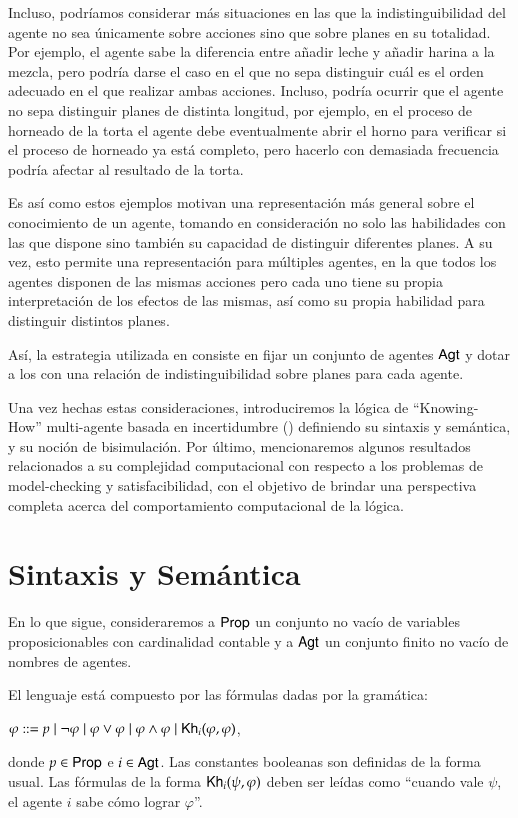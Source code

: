 Incluso, podríamos considerar más situaciones en las que la indistinguibilidad del agente no sea únicamente sobre acciones sino que sobre planes en su totalidad. Por ejemplo, 
el agente sabe la diferencia entre añadir leche y añadir harina a la mezcla, pero podría darse el caso en el que no sepa distinguir cuál es el orden adecuado en el que 
realizar ambas acciones. Incluso, podría ocurrir que el agente no sepa distinguir planes de distinta longitud, por ejemplo, en el proceso de horneado de la torta el agente 
debe eventualmente abrir el horno para verificar si el proceso de horneado ya está completo, pero hacerlo con demasiada frecuencia podría afectar al resultado de la torta.

Es así como estos ejemplos motivan una representación más general sobre el conocimiento de un agente, tomando en consideración no solo las habilidades con las que dispone sino 
también su capacidad de distinguir diferentes planes. A su vez, esto permite una representación para múltiples agentes, en la que todos los agentes disponen de las mismas acciones 
pero cada uno tiene su propia interpretación de los efectos de las mismas, así como su propia habilidad para distinguir distintos planes.

Así, la estrategia utilizada en \cite{ArecesFSV25,SaraviaPHD} consiste en fijar un conjunto de agentes ${\rm \sf Agt}$ y dotar a los \lts con una 
relación de indistinguibilidad sobre planes para cada agente.

Una vez hechas estas consideraciones, introduciremos la lógica de ``Knowing-How'' multi-agente basada en incertidumbre (\KHilogic) definiendo 
su sintaxis y semántica, y su noción de bisimulación. Por último, mencionaremos algunos resultados relacionados a su complejidad 
computacional con respecto a los problemas de model-checking y satisfacibilidad, con el objetivo de brindar una perspectiva completa acerca 
del comportamiento computacional de la lógica.

\section{Sintaxis y Semántica}
En lo que sigue, consideraremos a ${\rm \sf Prop}$ un conjunto no vacío de variables proposicionables con cardinalidad contable 
y a ${\rm \sf Agt}$ un conjunto finito no vacío de nombres de agentes.

\begin{definicion}
    El lenguaje \KHilogic está compuesto por las fórmulas dadas por la gramática:
    \begin{center}
        $\varphi ::= p \mid \neg \varphi \mid \varphi \vee \varphi \mid \varphi \wedge \varphi \mid \mathsf{Kh}_i(\varphi,\varphi)$,
    \end{center}
    donde $p \in {\rm \sf Prop}$ e $i \in {\rm \sf Agt}$. Las constantes booleanas son definidas de la forma usual. Las fórmulas de la forma 
    $\mathsf{Kh}_i(\psi, \varphi)$ deben ser leídas como ``cuando vale $\psi$, el agente $i$ sabe cómo lograr $\varphi$''.
\end{definicion}

